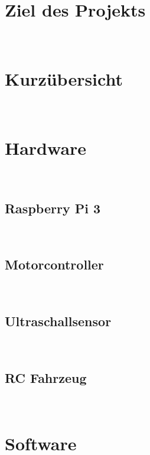 \documentclass[a4paper,12pt]{article}
\begin{document}
  \section{Ziel des Projekts}
    \ \\
  
  \section{Kurzübersicht}
    \ \\

  \section{Hardware}
    \ \\
    \subsection{Raspberry Pi 3}
    \ \\
    \subsection{Motorcontroller}
    \ \\
    \subsection{Ultraschallsensor}
    \ \\
    \subsection{RC Fahrzeug}
    \ \\
  
  \section{Software}
    \ \\
\end{document}
